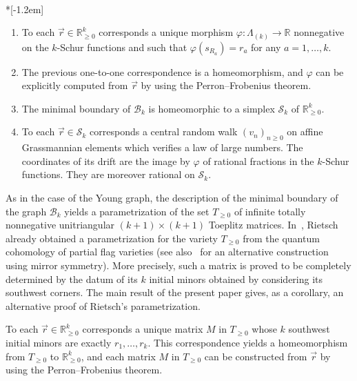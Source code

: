 \documentclass[ALCO,ThmDefs,Unicode,epreuves]{cedram}
\begin{document}
\goodbreak
\begin{theorem}\ \\*[-1.2em] 

\begin{enumerate}
\item To each $\vec{r}\in\mathbb{R}_{\geq0}^{k}$ corresponds a unique morphism
$\varphi:\Lambda_{(k)}\rightarrow\mathbb{R}$ nonnegative on the $k$-Schur
functions and such that $\varphi(s_{R_{a}})=r_{a}$ for any $a=1,\ldots,k.$

\item The previous one-to-one correspondence is a homeomorphism, and
$\varphi$ can be explicitly computed from $\vec{r}$ by using the Perron--Frobenius theorem.

\item The minimal boundary of $\mathcal{B}_{k}$ is homeomorphic to a simplex
$\mathcal{S}_{k}$ of $\mathbb{R}_{\geq0}^{k}$.

\item To each $\vec{r}\in\mathcal{S}_{k}$ corresponds a central random walk
$(v_{n})_{n\geq0}$ on affine Grassmannian elements which verifies a law of
large numbers. The coordinates of its drift are the image by $\varphi$ of
rational fractions in the $k$-Schur functions. They are moreover rational on
$\mathcal{S}_{k}$.
\end{enumerate}
\end{theorem}

As in the case of the Young graph, the description of the minimal boundary of the graph $\mathcal{B}_{k}$ yields a parametrization of the set $T_{\geq 0}$ of infinite totally nonnegative unitriangular $(k+1)\times(k+1)$ Toeplitz matrices. In~\cite{Ri}, Rietsch already obtained a parametrization for the variety $T_{\geq0}$ from the quantum cohomology of partial
flag varieties (see also~\cite{Ri2} for an alternative construction using mirror symmetry). More precisely, such a matrix is proved to be completely
determined by the datum of its $k$ initial minors obtained by considering its
southwest corners. The main result of the present paper gives, as a corollary, an alternative proof of Rietsch's parametrization.
\begin{coro}
To each $\vec{r}\in\mathbb{R}_{\geq0}^{k}$ corresponds a unique matrix
$M$ in $T_{\geq0}$ whose $k$ southwest initial minors are exactly
$r_{1},\ldots,r_{k}$. This correspondence yields a homeomorphism from $T_{\geq 0}$ to $\mathbb{R}_{\geq0}^{k}$, and each matrix $M$ in $T_{\geq 0}$ can be constructed from $\vec{r}$ by using the Perron--Frobenius theorem.
\end{coro}
\end{document}
